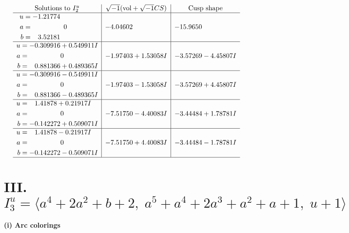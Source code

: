 \documentclass[1p]{elsarticle_modified}
\theoremstyle{definition}
\newcommand{\I}{\sqrt{-1}}
\begin{document}
$$\begin{array}{c|c|c}  
\text{Solutions to }I^u_{2}& \I (\text{vol} + \sqrt{-1}CS) & \text{Cusp shape}\\
 \hline 
\begin{aligned}
u &= -1.21774\phantom{ +0.000000I} \\
a &= \phantom{-0.000000 } 0 \\
b &= \phantom{-}3.52181\phantom{ +0.000000I}\end{aligned}
 & -4.04602\phantom{ +0.000000I} & -15.9650\phantom{ +0.000000I} \\ \hline\begin{aligned}
u &= -0.309916 + 0.549911 I \\
a &= \phantom{-0.000000 } 0 \\
b &= \phantom{-}0.881366 + 0.489365 I\end{aligned}
 & -1.97403 + 1.53058 I & -3.57269 - 4.45807 I \\ \hline\begin{aligned}
u &= -0.309916 - 0.549911 I \\
a &= \phantom{-0.000000 } 0 \\
b &= \phantom{-}0.881366 - 0.489365 I\end{aligned}
 & -1.97403 - 1.53058 I & -3.57269 + 4.45807 I \\ \hline\begin{aligned}
u &= \phantom{-}1.41878 + 0.21917 I \\
a &= \phantom{-0.000000 } 0 \\
b &= -0.142272 + 0.509071 I\end{aligned}
 & -7.51750 - 4.40083 I & -3.44484 + 1.78781 I \\ \hline\begin{aligned}
u &= \phantom{-}1.41878 - 0.21917 I \\
a &= \phantom{-0.000000 } 0 \\
b &= -0.142272 - 0.509071 I\end{aligned}
 & -7.51750 + 4.40083 I & -3.44484 - 1.78781 I\\
 \hline 
 \end{array}$$\newpage\newpage\renewcommand{\arraystretch}{1}
\centering \section*{III. $I^u_{3}= \langle a^4+2 a^2+b+2,\;a^5+a^4+2 a^3+a^2+a+1,\;u+1 \rangle$}
\flushleft \textbf{(i) Arc colorings}\\
\end{document}
